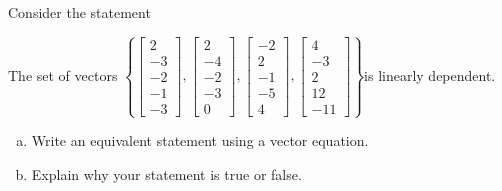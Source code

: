 
\begin{exerciseStatement}


Consider the statement 
\begin{center}\begin{minipage}{0.8\textwidth}
 The set of vectors \( \left\{ \left[\begin{array}{c}
2 \\
-3 \\
-2 \\
-1 \\
-3
\end{array}\right] , \left[\begin{array}{c}
2 \\
-4 \\
-2 \\
-3 \\
0
\end{array}\right] , \left[\begin{array}{c}
-2 \\
2 \\
-1 \\
-5 \\
4
\end{array}\right] , \left[\begin{array}{c}
4 \\
-3 \\
2 \\
12 \\
-11
\end{array}\right] \right\} \)is linearly dependent.
\end{minipage}\end{center}
    


\begin{enumerate}[(a)]
\item  Write an equivalent statement using a vector equation.
\item  Explain why your statement is true or false.
\end{enumerate}
    
\end{exerciseStatement}
    
